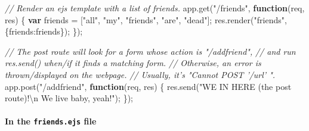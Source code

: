 \documentclass[11pt]{article}
\newenvironment{Shaded}{}{}
\newcommand{\KeywordTok}[1]{\textcolor[rgb]{0.00,0.44,0.13}{\textbf{{#1}}}}
\newcommand{\DataTypeTok}[1]{\textcolor[rgb]{0.56,0.13,0.00}{{#1}}}
\newcommand{\StringTok}[1]{\textcolor[rgb]{0.25,0.44,0.63}{{#1}}}
\newcommand{\CommentTok}[1]{\textcolor[rgb]{0.38,0.63,0.69}{\textit{{#1}}}}
\newcommand{\NormalTok}[1]{{#1}}
\newcommand{\SpecialCharTok}[1]{\textcolor[rgb]{0.25,0.44,0.63}{{#1}}}
\newcommand{\VariableTok}[1]{\textcolor[rgb]{0.10,0.09,0.49}{{#1}}}
\newcommand{\OperatorTok}[1]{\textcolor[rgb]{0.40,0.40,0.40}{{#1}}}
\newcommand{\AttributeTok}[1]{\textcolor[rgb]{0.49,0.56,0.16}{{#1}}}
\begin{document}
\begin{Shaded}
\begin{Highlighting}[]

\CommentTok{// Render an ejs template with a list of friends.}
\VariableTok{app}\NormalTok{.}\AttributeTok{get}\NormalTok{(}\StringTok{"/friends"}\OperatorTok{,} \KeywordTok{function}\NormalTok{(req}\OperatorTok{,}\NormalTok{ res) }\OperatorTok{\{}
  \KeywordTok{var}\NormalTok{ friends  }\OperatorTok{=}\NormalTok{ [}\StringTok{"all"}\OperatorTok{,} \StringTok{"my"}\OperatorTok{,} \StringTok{"friends"}\OperatorTok{,} \StringTok{"are"}\OperatorTok{,} \StringTok{"dead"}\NormalTok{]}\OperatorTok{;}
  \VariableTok{res}\NormalTok{.}\AttributeTok{render}\NormalTok{(}\StringTok{"friends"}\OperatorTok{,} \OperatorTok{\{}\DataTypeTok{friends}\OperatorTok{:}\NormalTok{friends}\OperatorTok{\}}\NormalTok{)}\OperatorTok{;}
\OperatorTok{\}}\NormalTok{)}\OperatorTok{;}

\CommentTok{// The post route will look for a form whose action is "/addfriend",}
\CommentTok{//   and run res.send() when/if it finds a matching form.}
\CommentTok{// Otherwise, an error is thrown/displayed on the webpage.}
\CommentTok{//   Usually, it's "Cannot POST '/url' ".}
\VariableTok{app}\NormalTok{.}\AttributeTok{post}\NormalTok{(}\StringTok{"/addfriend"}\OperatorTok{,} \KeywordTok{function}\NormalTok{(req}\OperatorTok{,}\NormalTok{ res) }\OperatorTok{\{}
  \VariableTok{res}\NormalTok{.}\AttributeTok{send}\NormalTok{(}\StringTok{"WE IN HERE (the post route)!}\SpecialCharTok{\textbackslash{}n}\StringTok{ We live baby, yeah!"}\NormalTok{)}\OperatorTok{;}
\OperatorTok{\}}\NormalTok{)}\OperatorTok{;}
\end{Highlighting}
\end{Shaded}

\hypertarget{in-the-friends.ejs-file}{%
\paragraph{\texorpdfstring{In the \texttt{friends.ejs}
file}{In the friends.ejs file}}\label{in-the-friends.ejs-file}}
\end{document}
